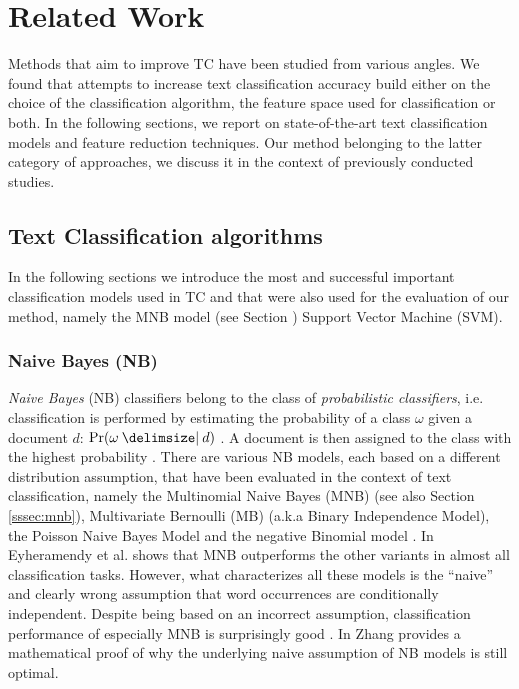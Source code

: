 \chapter{Related Work}
\label{ch:related-work}

Methods that aim to improve TC have been studied from various angles. We
found that attempts to increase text classification accuracy build either on the
choice of the classification algorithm, the feature space used
for classification or both. In the following sections, we report
on state-of-the-art text classification models and feature reduction
techniques. Our method belonging to the latter category of approaches, we discuss it  
in the context of previously conducted studies.

\section{Text Classification algorithms}

In the following sections we introduce the most and successful important classification models used 
in TC and that were also used for the evaluation of our method, namely the MNB model (see Section \label{sssec:mnb})
Support Vector Machine (SVM).   

\subsection{Naive Bayes (NB)}

\emph{Naive Bayes} (NB) classifiers belong to the class of \emph{probabilistic classifiers},
i.e. classification is performed by estimating the probability of a class $\omega$
given a document $d$: $\Pr(\omega \given d)$ . A document is then assigned 
to the class with the highest probability \cite{mccallum1998comparison}. 
There are various NB models, each based on a different distribution assumption,
that have been evaluated in the context of text classification, namely the Multinomial Naive Bayes (MNB) (see also Section
\ref{sssec:mnb}), Multivariate Bernoulli (MB) (a.k.a Binary Independence Model),
the Poisson Naive Bayes Model and the negative Binomial model
\cite{Eyheramendy2003, Lewis1998}. In \cite{Eyheramendy2003} Eyheramendy et al. 
shows that MNB outperforms the other variants in almost all classification
tasks. However, what characterizes all these models is the ``naive'' and
clearly wrong assumption that word occurrences are conditionally independent. Despite being
based on an incorrect assumption, classification performance of especially MNB
is surprisingly good \cite{wang2012baselines}. In \cite{zhang2004optimality} Zhang provides a
mathematical proof of why the underlying naive assumption of NB models is 
still optimal.

